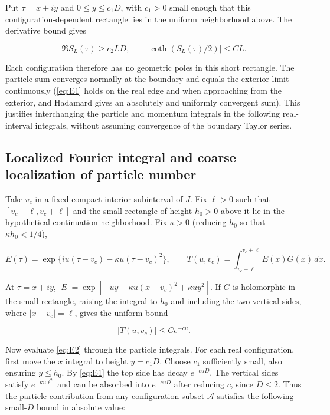 \documentclass[11pt,a4paper]{article}
\numberwithin{equation}{section}
\theoremstyle{plain}
\theoremstyle{definition}
\begin{document}
Put \(\tau=x+iy\) and \(0\le y\le c_1 D\), with \(c_1>0\) small enough that this configuration-dependent rectangle lies in the uniform neighborhood above. The derivative bound gives

\begin{equation}
\Re S_L(\tau)\ge c_2 L D,\qquad |\coth(S_L(\tau)/2)|\le C L.
\label{eq:E1}
\end{equation}

Each configuration therefore has no geometric poles in this short rectangle. The particle sum converges normally at the boundary and equals the exterior limit continuously (\eqref{eq:E1} holds on the real edge and when approaching from the exterior, and Hadamard gives an absolutely and uniformly convergent sum). This justifies interchanging the particle and momentum integrals in the following real-interval integrals, without assuming convergence of the boundary Taylor series.

\subsection{Localized Fourier integral and coarse localization of particle number}\label{sec:probe}

Take \(v_c\) in a fixed compact interior subinterval of \(J\). Fix \(\ell>0\) such that \([v_c-\ell,v_c+\ell]\) and the small rectangle of height \(h_0>0\) above it lie in the hypothetical continuation neighborhood. Fix \(\kappa>0\) (reducing \(h_0\) so that \(\kappa h_0<1/4\)),

\begin{equation}
E(\tau)=\exp\{iu(\tau-v_c)-\kappa u(\tau-v_c)^2\},\qquad T(u,v_c)=\int_{v_c-\ell}^{v_c+\ell}E(x)G(x)\,dx.
\label{eq:E2}
\end{equation}

At \(\tau=x+iy\), \(|E|=\exp[-uy-\kappa u(x-v_c)^2+\kappa u y^2]\). If \(G\) is holomorphic in the small rectangle, raising the integral to \(h_0\) and including the two vertical sides, where \(|x-v_c|=\ell\), gives the uniform bound

\begin{equation}
|T(u,v_c)|\le C e^{-c u}.
\label{eq:E3}
\end{equation}

Now evaluate \eqref{eq:E2} through the particle integrals. For each real configuration, first move the \(x\) integral to height \(y=c_1 D\). Choose \(c_1\) sufficiently small, also ensuring \(y\le h_0\). By \eqref{eq:E1} the top side has decay \(e^{-c u D}\). The vertical sides satisfy \(e^{-\kappa u\ell^2}\) and can be absorbed into \(e^{-c u D}\) after reducing \(c\), since \(D\le2\). Thus the particle contribution from any configuration subset \(\mathcal A\) satisfies the following small-\(D\) bound in absolute value:
\end{document}
